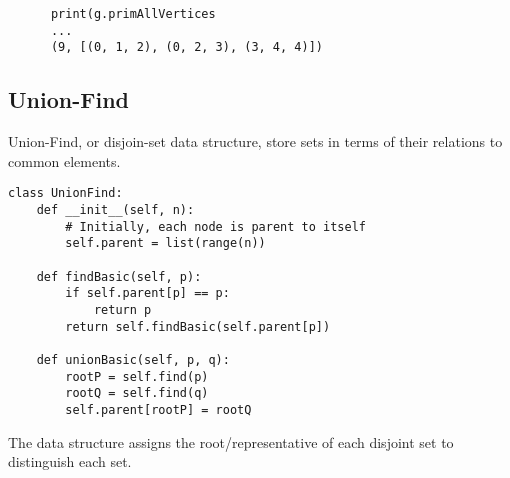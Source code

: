 \begin{center}
  \begin{verbatim}
      print(g.primAllVertices
      ...
      (9, [(0, 1, 2), (0, 2, 3), (3, 4, 4)])
  \end{verbatim}
\end{center}

\subsection{Union-Find}

Union-Find, or disjoin-set data structure, store sets in terms of their relations to common elements.

\begin{verbatim}
class UnionFind:
    def __init__(self, n):
        # Initially, each node is parent to itself
        self.parent = list(range(n))

    def findBasic(self, p):
        if self.parent[p] == p:
            return p
        return self.findBasic(self.parent[p])

    def unionBasic(self, p, q):
        rootP = self.find(p)
        rootQ = self.find(q)
        self.parent[rootP] = rootQ
\end{verbatim}

\noindent The data structure assigns the root/representative of each disjoint set to distinguish each set.

